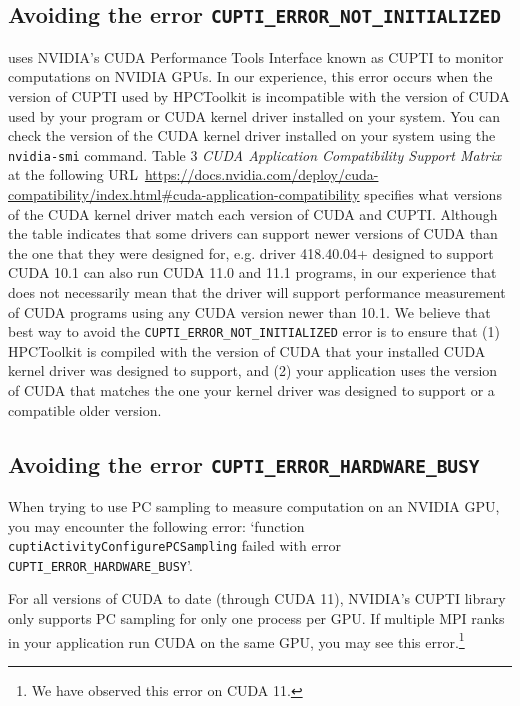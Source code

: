 \documentclass[11pt,twoside,letterpaper]{report}
\begin{document}
\subsection{Avoiding the error \texttt{CUPTI\_ERROR\_NOT\_INITIALIZED}}
\label{sec:troubleshooting:cupti}

\hpcrun{} uses NVIDIA's CUDA Performance Tools Interface known as
CUPTI to monitor computations on NVIDIA GPUs. In our experience,
this error occurs when the version of CUPTI used by HPCToolkit is
incompatible with the version of CUDA used by your program or CUDA kernel driver installed on your system. You can check the
version of the CUDA kernel driver installed on your system using the {\tt nvidia-smi} command. 
Table 3 {\em CUDA Application Compatibility Support Matrix} at the following URL~\url{https://docs.nvidia.com/deploy/cuda-compatibility/index.html\#cuda-application-compatibility} 
specifies what versions of the CUDA kernel driver match each version of CUDA and CUPTI. 
Although the table indicates that some drivers can support newer versions of CUDA than the one that they were designed for, 
e.g. driver 418.40.04+ designed to support CUDA 10.1 can also run CUDA 11.0 and 11.1 programs, 
in our experience that does not necessarily mean that the driver will support performance measurement of CUDA programs 
using any CUDA version newer than 10.1.
We believe that best way to avoid the \texttt{CUPTI\_ERROR\_NOT\_INITIALIZED} error is to ensure that 
(1) HPCToolkit is compiled with the version of CUDA that your installed CUDA kernel driver was designed to support, and 
(2) your application uses the version of CUDA that matches the one your kernel driver was designed to support or a compatible older version.



\subsection{Avoiding the error {\tt CUPTI\_ERROR\_HARDWARE\_BUSY}}

When trying to use PC sampling to measure computation on an NVIDIA GPU, you may encounter the following error: `function {\tt cuptiActivityConfigurePCSampling} failed with error {\tt CUPTI\_ERROR\_HARDWARE\_BUSY}'.

For all versions of CUDA  to date (through CUDA 11), NVIDIA's CUPTI library only supports PC sampling for only one process per GPU. If multiple MPI ranks in your application run CUDA on the same GPU, you may see this error.\footnote{We have observed this error on CUDA 11.}
\end{document}
